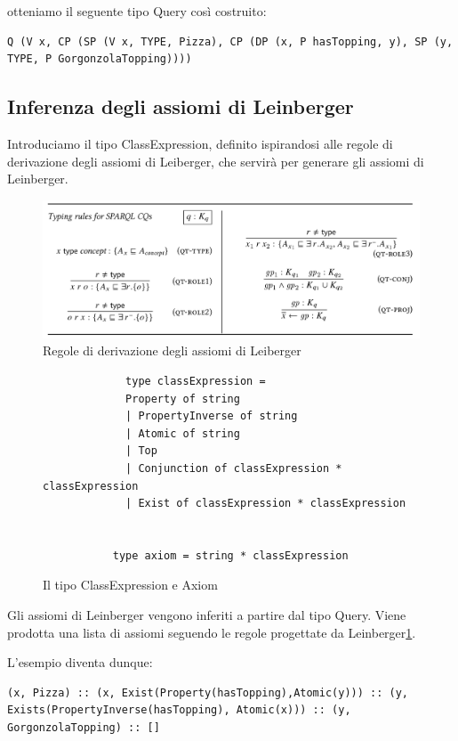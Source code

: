 otteniamo il seguente tipo Query così costruito:

\begin{verbatim}
Q (V x, CP (SP (V x, TYPE, Pizza), CP (DP (x, P hasTopping, y), SP (y, TYPE, P GorgonzolaTopping))))
\end{verbatim}

\subsection{Inferenza degli assiomi di Leinberger}
Introduciamo il tipo ClassExpression, definito ispirandosi alle regole di derivazione degli assiomi di Leiberger, che servirà per generare gli assiomi di Leinberger.
\begin{figure}[H]
    \centering
    \includegraphics[width=\textwidth]{pictures/leinbergAxiom.png}
    \caption{Regole di derivazione degli assiomi di Leiberger}
    \label{fig:leinbergerAxiom}
\end{figure}

\begin{figure}[H]
    \centering
    \begin{verbatim}
    	     type classExpression =
  	         Property of string
    	     | PropertyInverse of string
    	     | Atomic of string
    	     | Top
    	     | Conjunction of classExpression * classExpression
    	     | Exist of classExpression * classExpression
    	
    	
      	   type axiom = string * classExpression
    \end{verbatim}
    \caption{Il tipo ClassExpression e Axiom}
    \label{fig:enter-label}
\end{figure}
Gli assiomi di Leinberger vengono inferiti a partire dal tipo Query. Viene prodotta una lista di assiomi seguendo le regole progettate da Leinberger\ref{fig:leinbergerAxiom}.

L'esempio diventa dunque:
\begin{verbatim}
(x, Pizza) :: (x, Exist(Property(hasTopping),Atomic(y))) :: (y, Exists(PropertyInverse(hasTopping), Atomic(x))) :: (y, GorgonzolaTopping) :: []
\end{verbatim}

